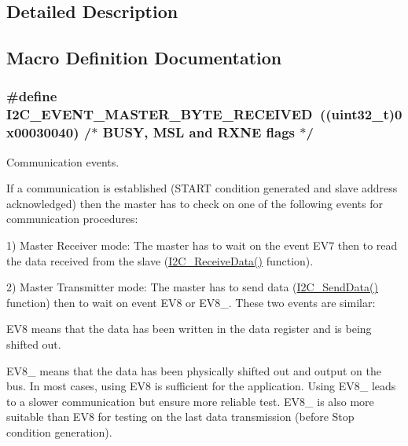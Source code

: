 \subsection{Detailed Description}


\subsection{Macro Definition Documentation}
\hypertarget{group___i2_c___events_ga6bcf2ae49961e07e27cf9fdf334719e3}{
\subsubsection[{I2\-C\-\_\-\-E\-V\-E\-N\-T\-\_\-\-M\-A\-S\-T\-E\-R\-\_\-\-B\-Y\-T\-E\-\_\-\-R\-E\-C\-E\-I\-V\-E\-D}]{\setlength{\rightskip}{0pt plus 5cm}\#define I2\-C\-\_\-\-E\-V\-E\-N\-T\-\_\-\-M\-A\-S\-T\-E\-R\-\_\-\-B\-Y\-T\-E\-\_\-\-R\-E\-C\-E\-I\-V\-E\-D~((uint32\-\_\-t)0x00030040)  /$\ast$ B\-U\-S\-Y, M\-S\-L and R\-X\-N\-E flags $\ast$/}}\label{group___i2_c___events_ga6bcf2ae49961e07e27cf9fdf334719e3}


Communication events. 

If a communication is established (S\-T\-A\-R\-T condition generated and slave address acknowledged) then the master has to check on one of the following events for communication procedures\-:

1) Master Receiver mode\-: The master has to wait on the event E\-V7 then to read the data received from the slave (\hyperlink{group___i2_c_gaeaaa4b6f77f50eb57465148c55d27fb2}{I2\-C\-\_\-\-Receive\-Data()} function).

2) Master Transmitter mode\-: The master has to send data (\hyperlink{group___i2_c_ga7bd9e70b8eafde0dd5eb42b0d95fe1a9}{I2\-C\-\_\-\-Send\-Data()} function) then to wait on event E\-V8 or E\-V8\-\_. These two events are similar\-:
\begin{DoxyItemize}
\item E\-V8 means that the data has been written in the data register and is being shifted out.
\item E\-V8\-\_ means that the data has been physically shifted out and output on the bus. In most cases, using E\-V8 is sufficient for the application. Using E\-V8\-\_ leads to a slower communication but ensure more reliable test. E\-V8\-\_ is also more suitable than E\-V8 for testing on the last data transmission (before Stop condition generation).
\end{DoxyItemize}

